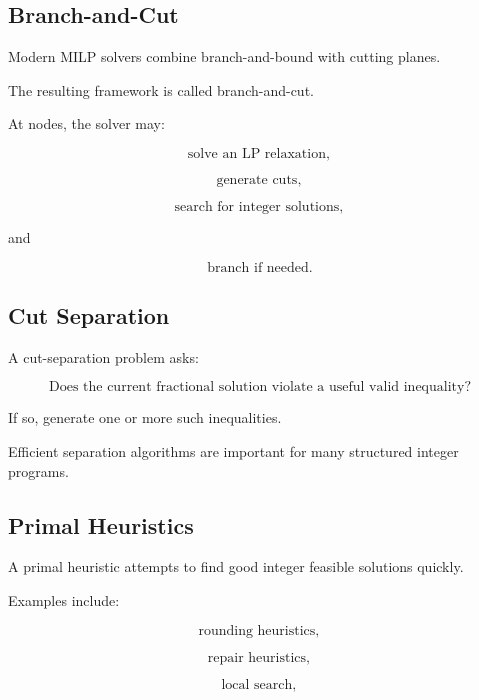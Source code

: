 \subsection{Branch-and-Cut}
\label{subsec:branch-and-cut}

Modern MILP solvers combine branch-and-bound with cutting planes.

The resulting framework is called branch-and-cut.

At nodes, the solver may:

\[
\boxed{
\text{solve an LP relaxation},
}
\]

\[
\boxed{
\text{generate cuts},
}
\]

\[
\boxed{
\text{search for integer solutions},
}
\]

and

\[
\boxed{
\text{branch if needed}.
}
\]

\subsection{Cut Separation}
\label{subsec:cut-separation}

A cut-separation problem asks:

\[
\boxed{
\text{Does the current fractional solution violate a useful valid inequality?}
}
\]

If so, generate one or more such inequalities.

Efficient separation algorithms are important for many structured
integer programs.

\subsection{Primal Heuristics}
\label{subsec:integer-primal-heuristics}

A primal heuristic attempts to find good integer feasible solutions
quickly.

Examples include:

\[
\boxed{
\text{rounding heuristics},
}
\]

\[
\boxed{
\text{repair heuristics},
}
\]

\[
\boxed{
\text{local search},
}
\]

